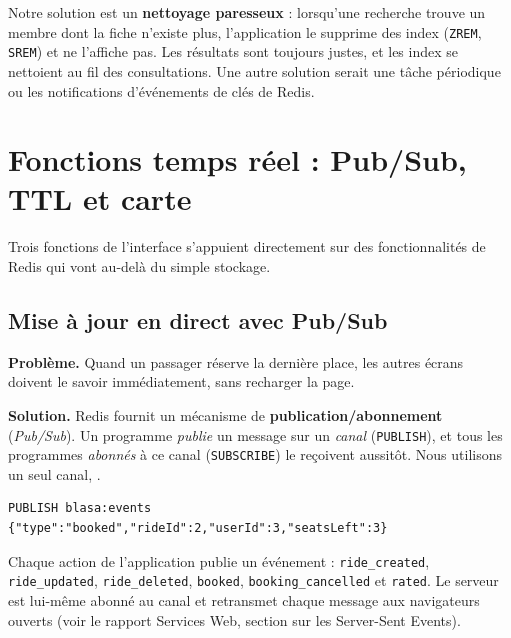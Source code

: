 \documentclass[11pt,a4paper]{article}
\newcommand{\cle}[1]{\texttt{\detokenize{#1}}}
\begin{document}
Notre solution est un \textbf{nettoyage paresseux} : lorsqu'une recherche trouve un membre dont la fiche n'existe plus, l'application le supprime des index (\texttt{ZREM}, \texttt{SREM}) et ne l'affiche pas. Les r\'esultats sont toujours justes, et les index se nettoient au fil des consultations. Une autre solution serait une t\^ache p\'eriodique ou les notifications d'\'ev\'enements de cl\'es de Redis.

\section{Fonctions temps r\'eel : Pub/Sub, TTL et carte}
Trois fonctions de l'interface s'appuient directement sur des fonctionnalit\'es de Redis qui vont au-del\`a du simple stockage.

\subsection{Mise \`a jour en direct avec Pub/Sub}
\textbf{Probl\`eme.} Quand un passager r\'eserve la derni\`ere place, les autres \'ecrans doivent le savoir imm\'ediatement, sans recharger la page.

\textbf{Solution.} Redis fournit un m\'ecanisme de \textbf{publication/abonnement} (\emph{Pub/Sub}). Un programme \emph{publie} un message sur un \emph{canal} (\texttt{PUBLISH}), et tous les programmes \emph{abonn\'es} \`a ce canal (\texttt{SUBSCRIBE}) le re\c coivent aussit\^ot. Nous utilisons un seul canal, \cle{blasa:events}.

\begin{lstlisting}
PUBLISH blasa:events {"type":"booked","rideId":2,"userId":3,"seatsLeft":3}
\end{lstlisting}

Chaque action de l'application publie un \'ev\'enement : \texttt{ride\_created}, \texttt{ride\_updated}, \texttt{ride\_deleted}, \texttt{booked}, \texttt{booking\_cancelled} et \texttt{rated}. Le serveur est lui-m\^eme abonn\'e au canal et retransmet chaque message aux navigateurs ouverts (voir le rapport Services Web, section sur les Server-Sent Events).
\end{document}
